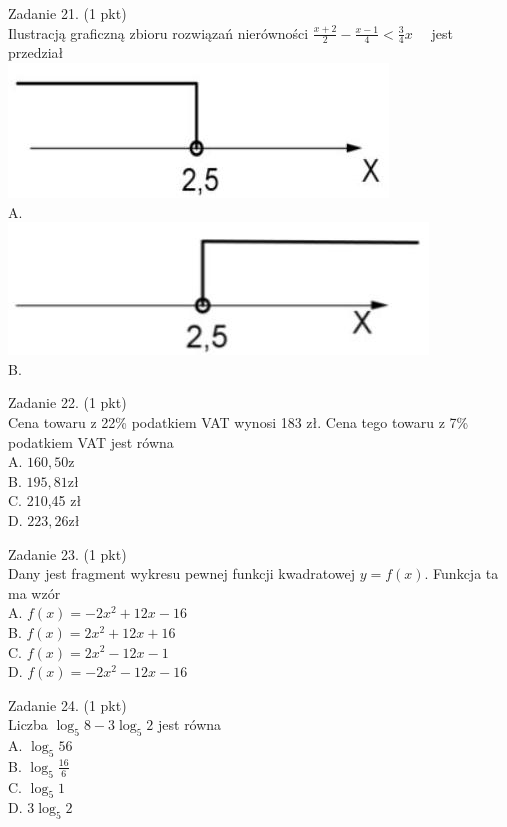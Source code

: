 \documentclass[10pt]{article}
\begin{document}
Zadanie 21. (1 pkt)\\
Ilustracją graficzną zbioru rozwiązań nierówności \(\frac{x+2}{2}-\frac{x-1}{4}<\frac{3}{4} x \quad\) jest przedział\\
\includegraphics[max width=\textwidth, center]{2024_11_21_8e981e1ab2c7e641f462g-08}\\
A.\\
\includegraphics[max width=\textwidth, center]{2024_11_21_8e981e1ab2c7e641f462g-08(1)}\\
B.

Zadanie 22. (1 pkt)\\
Cena towaru z 22\% podatkiem VAT wynosi 183 zł. Cena tego towaru z 7\% podatkiem VAT jest równa\\
A. \(160,50 \mathrm{z}\)\\
B. \(195,81 \mathrm{zł}\)\\
C. 210,45 zł\\
D. \(223,26 \mathrm{zł}\)

Zadanie 23. (1 pkt)\\
Dany jest fragment wykresu pewnej funkcji kwadratowej \(y=f(x)\). Funkcja ta ma wzór\\
A. \(f(x)=-2 x^{2}+12 x-16\)\\
B. \(f(x)=2 x^{2}+12 x+16\)\\
C. \(f(x)=2 x^{2}-12 x-1\)\\
D. \(f(x)=-2 x^{2}-12 x-16\)

Zadanie 24. (1 pkt)\\
Liczba \(\log _{5} 8-3 \log _{5} 2\) jest równa\\
A. \(\log _{5} 56\)\\
B. \(\log _{5} \frac{16}{6}\)\\
C. \(\log _{5} 1\)\\
D. \(3 \log _{5} 2\)
\end{document}
